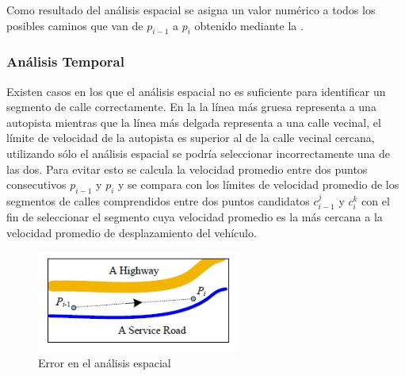Como resultado del análisis espacial se asigna un valor numérico a todos los posibles caminos que van de $p_{i-1}$ a $p_i$ obtenido mediante la .

\subsubsection{Análisis Temporal}

Existen casos en los que el análisis espacial no es suficiente para identificar un segmento de calle correctamente. En la  la línea más gruesa representa a una autopista mientras que la línea más delgada representa a una calle vecinal, el límite de velocidad de la autopista es superior al de la calle vecinal cercana, utilizando sólo el análisis espacial se podría seleccionar incorrectamente una de las dos. Para evitar esto se calcula la velocidad promedio entre dos puntos consecutivos $p_{i-1}$ y $p_i$ y se compara con los límites de velocidad promedio de los segmentos de calles comprendidos entre dos puntos candidatos $c_{i-1}^{j}$ y $c_{i}^{k}$ con el fin de seleccionar el segmento cuya velocidad promedio es la más cercana a la velocidad promedio de desplazamiento del vehículo.

\begin{figure}[h*]
	\centering
	\includegraphics[width=0.6\textwidth]{capitulos/6/figuras/figura8.jpg}
	\caption{\label{fig:analisis_temporal} Error en el análisis espacial}	
\end{figure}

